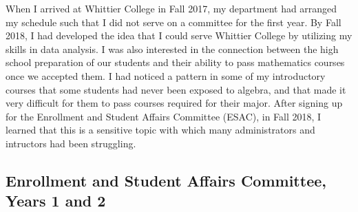\documentclass[../../../main.tex]{subfiles}
\begin{document}
When I arrived at Whittier College in Fall 2017, my department had arranged my schedule such that I did not serve on a committee for the first year.  By Fall 2018, I had developed the idea that I could serve Whittier College by utilizing my skills in data analysis.  I was also interested in the connection between the high school preparation of our students and their ability to pass mathematics courses once we accepted them.  I had noticed a pattern in some of my introductory courses that some students had never been exposed to algebra, and that made it very difficult for them to pass courses required for their major.  After signing up for the Enrollment and Student Affairs Committee (ESAC), in Fall 2018, I learned that this is a sensitive topic with which many administrators and intructors had been struggling.

\subsection{Enrollment and Student Affairs Committee, Years 1 and 2}
\end{document}

